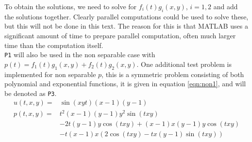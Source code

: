 To obtain the solutions, we need to solve for $f_i(t) g_i(x,y)$, $i = 1,2 $ and add the solutions together. Clearly parallel computations could be used to solve these, but this will not be done in this text. The reason for this is that MATLAB uses a significant amount of time to prepare parallel computation, often much larger time than the computation itself.\\

\texttt{P1} will also be used in the non separable case with $p(t) = f_1(t) g_1(x,y) + f_2(t) g_2(x,y)$.
One additional test problem is implemented for non separable $p$, this is a symmetric problem consisting of both polynomial and exponential functions, it is given in equation \eqref{eqn:non1}, and will be denoted as \texttt{P3}.
\begin{equation} \label{eqn:non1}
\begin{aligned}
 u(t,x,y) = & \sin(x y t) (x-1) (y-1)\\
 p(t,x,y) = & t^2 (x-1) (y-1) y^2 \sin(t x y)\\ & -2 t (y-1) y \cos(t x y)+(x-1) x (y-1) y \cos(t x y)\\ & -t (x-1) x (2 \cos(t x y)-t x (y-1) \sin(t x y))
\end{aligned}
\end{equation}